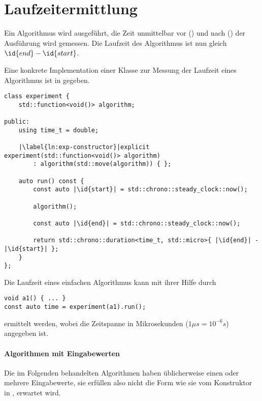 \section{Laufzeitermittlung}
\label{sec:laufzeiterm}

Ein Algorithmus wird ausgeführt, die Zeit unmittelbar vor () und nach () der Ausführung wird gemessen. Die Laufzeit des Algorithmus ist nun gleich $\id{end} - \id{start}$.

Eine konkrete Implementation einer Klasse zur Messung der Laufzeit eines Algorithmus ist in  gegeben. 

\begin{lstlisting}[caption={Implementation einer Klasse zur Ermittlung der Laufzeit eines Algorithmus.}, label=lst:experiment]
class experiment {
	std::function<void()> algorithm;

public:
	using time_t = double;

	|\label{ln:exp-constructor}|explicit experiment(std::function<void()> algorithm)
		: algorithm(std::move(algorithm)) { };

	auto run() const {
		const auto |\id{start}| = std::chrono::steady_clock::now();

		algorithm();

		const auto |\id{end}| = std::chrono::steady_clock::now();

		return std::chrono::duration<time_t, std::micro>{ |\id{end}| - |\id{start}| };
	}
};
\end{lstlisting}

Die Laufzeit eines einfachen Algorithmus kann mit ihrer Hilfe durch
\begin{lstlisting}[numbers=none]
void a1() { ... }
const auto time = experiment(a1).run();
\end{lstlisting}
ermittelt werden, wobei die Zeitspanne in Mikrosekunden ($1\mu s = 10^{-6} s$) angegeben ist.

\paragraph{Algorithmen mit Eingabewerten} Die im Folgenden behandelten Algorithmen haben üblicherweise einen oder mehrere Eingabewerte, sie erfüllen also nicht die Form wie sie vom Konstruktor in ,  erwartet wird.

